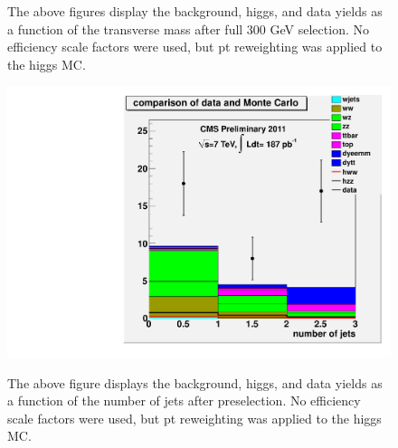 \begin{figure}[!hbtp]
\begin{center}
\label{}
\caption{The above figures display the background, higgs, and data yields as a function of the transverse mass after full 300 GeV selection. No efficiency scale factors were used, but pt reweighting was applied to the higgs MC.}
\end{center}
\end{figure}

\begin{figure}[!hbtp]
\begin{center}
\label{}
\includegraphics[width=.45\textwidth]{figures/preselection_njets.pdf}
\caption{The above figure displays the background, higgs, and data yields as a function of the number of jets after preselection. No efficiency scale factors were used, but pt reweighting was applied to the higgs MC.}
\end{center}
\end{figure}

